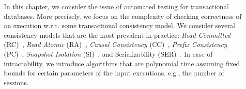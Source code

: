 %

%
%
%
%
In this chapter, we consider the issue of automated testing for transactional databases. More precisely, we focus on the complexity of checking correctness of an execution w.r.t. some transactional consistency model. We consider several consistency models that are the most prevalent in practice: \emph{Read Committed} (RC)~\cite{DBLP:conf/sigmod/BerensonBGMOO95}, \emph{Read Atomic} (RA)~\cite{DBLP:conf/concur/Cerone0G15}, \emph{Causal Consistency} (CC)~\cite{DBLP:journals/cacm/Lamport78}, \emph{Prefix Consistency} (PC)~\cite{DBLP:conf/ecoop/BurckhardtLPF15}, \emph{Snapshot Isolation} (SI)~\cite{DBLP:conf/sigmod/BerensonBGMOO95}, and Serializability (SER)~\cite{DBLP:journals/jacm/Papadimitriou79b}. In case of intractability, we introduce algorithms that are polynomial time assuming fixed bounds for certain parameters of the input executions, e.g., the number of sessions. 

